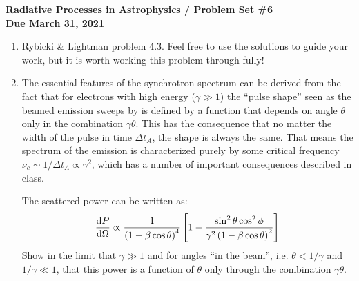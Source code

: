 \documentclass[11pt, preprint]{article}
\begin{document}
\begin{center}
  {\bf Radiative Processes in Astrophysics / Problem Set \#6 \\
    Due March 31, 2021}
\end{center}

\begin{enumerate}
\item Rybicki \& Lightman problem 4.3. Feel free to use the solutions
  to guide your work, but it is worth working this problem through
  fully!
\item The essential features of the synchrotron spectrum can be
  derived from the fact that for electrons with high energy ($\gamma
  \gg 1$) the ``pulse shape'' seen as the beamed emission sweeps by is
  defined by a function that depends on angle $\theta$ only in the
  combination $\gamma\theta$. This has the consequence that no matter
  the width of the pulse in time $\Delta t_A$, the shape is always the
  same. That means the spectrum of the emission is characterized
  purely by some critical frequency $\nu_c \sim 1 / \Delta t_A \propto
  \gamma^2$, which has a number of important consequences described in
  class.

  The scattered power can be written as:
  \begin{equation}
    \frac{{\rm d}P}{{\rm d}\Omega} \propto
    \frac{1}{\left(1-\beta\cos\theta\right)^4}
    \left[1 - \frac{\sin^2\theta \cos^2\phi}{\gamma^2 \left(1 -\beta
        \cos\theta\right)^2}\right]
  \end{equation}
  Show in the limit that $\gamma\gg 1$ and for angles ``in the beam'',
  i.e.  $\theta < 1/\gamma$ and $1/\gamma \ll 1$, that this power is a
  function of $\theta$ only through the combination $\gamma\theta$.
  
\end{enumerate}
\end{document}
